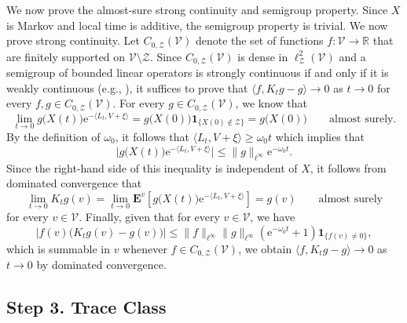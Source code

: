 \documentclass{amsart}
\numberwithin{equation}{section}
\theoremstyle{definition}
\newcommand\om{\omega}
\newcommand\mbb{\mathbb}
\newcommand\mbf{\mathbf}
\newcommand\mr{\mathrm}
\newcommand\ms{\mathscr}
\begin{document}
% 


We now prove the almost-sure strong continuity and semigroup property.
Since $X$ is Markov and local time is additive, the semigroup property is trivial. We now prove strong continuity.
Let $C_{0,\ms Z}(\ms V)$ denote the set of functions $f:\ms V\to\mbb R$ that are finitely supported
on $\ms V\setminus\ms Z$.
Since $C_{0,\ms Z}(\ms V)$ is dense in $\ell^2_\ms Z(\ms V)$ and a semigroup of bounded linear
operators is strongly continuous if and only if it is weakly continuous
(e.g., \cite[Chapter I, Theorem 5.8]{EngelNagel}), it suffices to prove that
$\langle f,K_tg-g\rangle\to0$ as $t\to0$ for every $f,g\in C_{0,\ms Z}(\ms V)$.
For every $g\in C_{0,\ms Z}(\ms V)$, we know that
\[\lim_{t\to0}g\big(X(t)\big)\mr e^{-\langle L_t,V+\xi\rangle}=g\big(X(0)\big)\mbf 1_{\{X(0)\not\in\ms Z\}}=g\big(X(0)\big)\qquad\text{almost surely}.\]
By the definition of $\om_0$, it follows that $\langle L_t,V+\xi\rangle\geq \om_0 t$ which implies that
\[\big|g\big(X(t)\big)\mr e^{-\langle L_t,V+\xi\rangle}\big|\leq\|g\|_{\ell^\infty}\mr e^{-\om_0t}.\] Since the right-hand side of this inequality is independent of $X$, it follows from dominated
convergence that
\[\lim_{t\to0}K_tg(v)=\lim_{t\to0}\mbf E^v\left[g\big(X(t)\big)\mr e^{-\langle L_t,V+\xi\rangle}\right]=g(v)\qquad\text{almost surely}\]
for every $v\in\ms V$. Finally, given that for every $v\in\ms V$, we have 
\[\big|f(v)\big(K_tg(v)-g(v)\big)\big|\leq\|f\|_{\ell^\infty}\|g\|_{\ell^\infty}(\mr e^{-\om_0t}+1)\mbf 1_{\{f(v)\neq0\}},\]
which is summable in $v$ whenever $f\in C_{0,\ms Z}(\ms V)$,
we obtain $\langle f,K_tg-g\rangle\to0$ as $t\to0$ by dominated convergence.

%

\subsection{Step 3. Trace Class}

%
\end{document}
